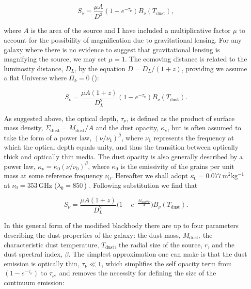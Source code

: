 \begin{equation}
	S_\nu = \frac{\mu A}{D^2}(1 - e^{-\tau_\nu}) B_\nu(T_{\textrm{dust}}),
\label{eq:modified_blackbody_area}
\end{equation}

where $A$ is the area of the source and I have included a multiplicative factor $\mu$ to account for the possibility of magnification due to gravitational lensing. For any galaxy where there is no evidence to suggest that gravitational lensing is magnifying the source, we may set $\mu = 1$. The comoving distance is related to the luminosity distance, $D_L$, by the equation $D = D_L/(1+z)$, providing we assume a flat Universe where $\Omega_k = 0$ (\citealt{Hogg_1999}):

\begin{equation}
	S_\nu = \frac{\mu A (1+z)}{D_L^2}(1 - e^{-\tau_\nu}) B_\nu(T_{\textrm{dust}}).
	\label{eq:modified_blackbody_area_dl}
\end{equation}

As suggested above, the optical depth, $\tau_\nu$, is defined as the product of surface mass density, $\Sigma_{\textrm{dust}} = M_{\textrm{dust}}/A$ and the dust opacity, $\kappa_\nu$, but is often assumed to take the form of a power law, $(\nu/\nu_1)^\beta$, where $\nu_1$ represents the frequency at which the optical depth equals unity, and thus the transition between optically thick and optically thin media. The dust opacity is also generally described by a power law, $\kappa_\nu = \kappa_0(\nu/\nu_0)^\beta$, where $\kappa_0$ is the emissivity of the grains per unit mass at some reference frequency $\nu_0$. Hereafter we shall adopt $\kappa_0 = 0.077$\,m$^2$kg$^{-1}$ at $\nu_0 = 353$\,GHz ($\lambda_0 = 850$\,\micron) . Following substitution we find that

\begin{equation}
	S_\nu = \frac{\mu A (1+z)}{D_L^2}\Bigg(1 - e^{- \frac{M_{\textrm{dust}}\kappa_\nu}{A}}\Bigg) B_\nu(T_{\textrm{dust}}).
	\label{eq:modified_blackbody_general_opacity_a}
\end{equation}

In this general form of the modified blackbody there are up to four parameters describing the dust properties of the galaxy: the dust mass, $M_{\textrm{dust}}$, the characteristic dust temperature, $T_{\textrm{dust}}$, the radial size of the source, $r$, and the dust spectral index, $\beta$. The simplest approximation one can make is that the dust emission is optically thin, $\tau_\nu \ll 1$, which simplifies the self opacity term from $(1 - e^{-\tau_\nu})$ to $\tau_\nu$, and removes the necessity for defining the size of the continuum emission:


